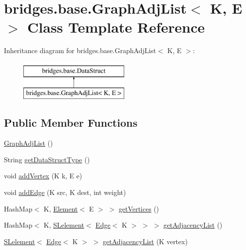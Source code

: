\hypertarget{classbridges_1_1base_1_1_graph_adj_list}{}\section{bridges.\+base.\+Graph\+Adj\+List$<$ K, E $>$ Class Template Reference}
\label{classbridges_1_1base_1_1_graph_adj_list}
Inheritance diagram for bridges.\+base.\+Graph\+Adj\+List$<$ K, E $>$\+:\begin{figure}[H]
\begin{center}
\leavevmode
\includegraphics[height=2.000000cm]{classbridges_1_1base_1_1_graph_adj_list}
\end{center}
\end{figure}
\subsection*{Public Member Functions}
\begin{DoxyCompactItemize}
\item 
\hyperlink{classbridges_1_1base_1_1_graph_adj_list_a822f5f0981773a227c98c463850a0700}{Graph\+Adj\+List} ()
\item 
String \hyperlink{classbridges_1_1base_1_1_graph_adj_list_a6995a5dcee3b07e041e12e27241f9423}{get\+Data\+Struct\+Type} ()
\item 
void \hyperlink{classbridges_1_1base_1_1_graph_adj_list_a2fdb7b6c143d1beb245a333db105372c}{add\+Vertex} (K k, E e)
\item 
void \hyperlink{classbridges_1_1base_1_1_graph_adj_list_a955fd8c7211f482826b47ad800702c10}{add\+Edge} (K src, K dest, int weight)
\item 
Hash\+Map$<$ K, \hyperlink{classbridges_1_1base_1_1_element}{Element}$<$ E $>$ $>$ \hyperlink{classbridges_1_1base_1_1_graph_adj_list_a19abf0bd09f0420e61cc144aec141f0a}{get\+Vertices} ()
\item 
Hash\+Map$<$ K, \hyperlink{classbridges_1_1base_1_1_s_lelement}{S\+Lelement}$<$ \hyperlink{classbridges_1_1base_1_1_edge}{Edge}$<$ K $>$ $>$ $>$ \hyperlink{classbridges_1_1base_1_1_graph_adj_list_a61ebebad4b053797240fef2b42b57630}{get\+Adjacency\+List} ()
\item 
\hyperlink{classbridges_1_1base_1_1_s_lelement}{S\+Lelement}$<$ \hyperlink{classbridges_1_1base_1_1_edge}{Edge}$<$ K $>$ $>$ \hyperlink{classbridges_1_1base_1_1_graph_adj_list_a331531e9ce428c35321fae6df143fbcf}{get\+Adjacency\+List} (K vertex)
\end{DoxyCompactItemize}
